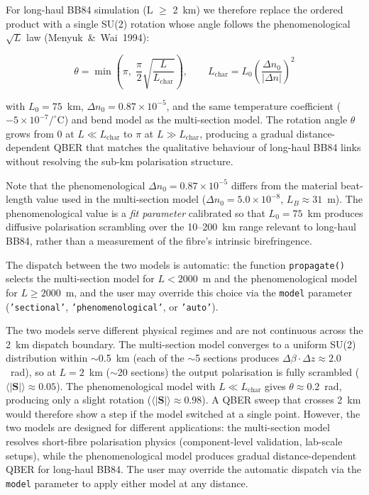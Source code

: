 \documentclass[11pt,a4paper]{article}
\begin{document}
For long-haul BB84 simulation (L $\ge$ 2~km) we therefore replace
the ordered product with a single SU(2) rotation whose angle
follows the phenomenological $\sqrt{L}$ law
(Menyuk~\&~Wai~1994):

\begin{equation}
  \theta = \min\!\left(\pi,\; \frac{\pi}{2}\sqrt{\frac{L}{L_{\text{char}}}}\right),\qquad
  L_{\text{char}} = L_0 \left(\frac{\Delta n_0}{|\Delta n|}\right)^2
  \label{eq:biref-phenom}
\end{equation}

with $L_0 = 75$~km, $\Delta n_0 = 0.87\times10^{-5}$, and the same
temperature coefficient ($-5\times10^{-7}/^\circ$C) and bend model
as the multi-section model.  The rotation angle $\theta$ grows
from 0 at $L \ll L_{\text{char}}$ to $\pi$ at $L \gg L_{\text{char}}$,
producing a gradual distance-dependent QBER that matches the
qualitative behaviour of long-haul BB84 links without resolving
the sub-km polarisation structure.

Note that the phenomenological $\Delta n_0 = 0.87\times10^{-5}$
differs from the material beat-length value used in the multi-section
model ($\Delta n_0 = 5.0\times10^{-8}$, $L_B \approx 31$~m).
The phenomenological value is a \emph{fit parameter} calibrated so
that $L_0 = 75$~km produces diffusive polarisation scrambling over
the 10--200~km range relevant to long-haul BB84, rather than a
measurement of the fibre's intrinsic birefringence.

The dispatch between the two models is automatic: the function
\texttt{propagate()} selects the multi-section model for
$L < 2000$~m and the phenomenological model for $L \ge 2000$~m,
and the user may override this choice via the \texttt{model}
parameter (\texttt{'sectional'}, \texttt{'phenomenological'},
or \texttt{'auto'}).

The two models serve different physical regimes and are not
continuous across the 2~km dispatch boundary.  The multi-section
model converges to a uniform SU(2) distribution within
$\sim$0.5~km (each of the $\sim$5 sections produces
$\Delta\beta\cdot\Delta z \approx 2.0$~rad), so at
$L = 2$~km ($\sim$20 sections) the output polarisation is fully
scrambled ($\langle|\mathbf{S}|\rangle \approx 0.05$).
The phenomenological model with $L \ll L_{\text{char}}$ gives
$\theta \approx 0.2$~rad, producing only a slight rotation
($\langle|\mathbf{S}|\rangle \approx 0.98$).  A QBER sweep that
crosses 2~km would therefore show a step if the model switched
at a single point.  However, the two models are designed for
different applications: the multi-section model resolves
short-fibre polarisation physics (component-level validation,
lab-scale setups), while the phenomenological model produces
gradual distance-dependent QBER for long-haul BB84.  The user
may override the automatic dispatch via the \texttt{model}
parameter to apply either model at any distance.
\end{document}
